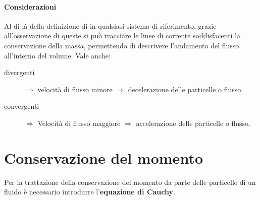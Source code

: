 \paragraph{Considerazioni}
Al di là della definizione di  in qualsiasi sistema di riferimento, grazie all'osservazione di queste si può tracciare le linee di corrente soddisfacenti la conservazione della massa, permettendo di descrivere l'andamento del flusso all'interno del volume.
Vale anche:
\begin{description}
\item[ divergenti] $\Rightarrow$ velocità di flusso minore $\Rightarrow$ decelerazione delle particelle o flusso.
\item[ convergenti] $\Rightarrow$ Velocità di flusso maggiore $\Rightarrow$ accelerazione delle particelle o flusso.
\end{description}

\section{Conservazione del momento}
Per la trattazione della conservazione del momento da parte delle particelle di un fluido è necessario introdurre l'\textbf{equazione di Cauchy}.

